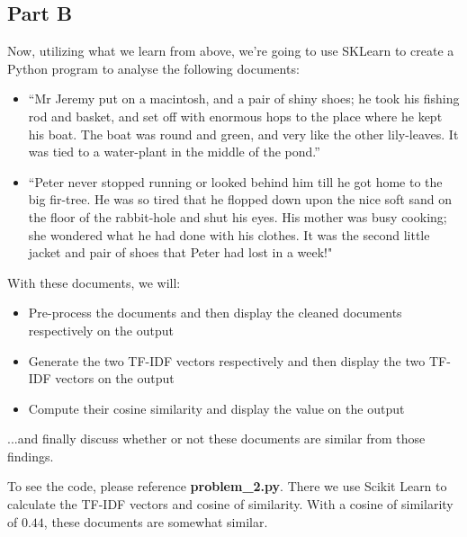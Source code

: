 \documentclass{article}
\begin{document}
\subsection*{Part B}

Now, utilizing what we learn from above, we're going to use SKLearn to create a Python program to analyse the following documents:

\begin{itemize}
    \item “Mr Jeremy put on a macintosh, and a pair of shiny shoes; he took his fishing rod and basket, and set off with enormous hops to the place where he kept his boat. The boat was round and green, and very like the other lily-leaves. It was tied to a water-plant in the middle of the pond.”
    \item “Peter never stopped running or looked behind him till he got home to the big fir-tree. He was so tired that he flopped down upon the nice soft sand on the floor of the rabbit-hole and shut his eyes. His mother was busy cooking; she wondered what he had done with his clothes. It was the second little jacket and pair of shoes that Peter had lost in a week!"
\end{itemize}

With these documents, we will:

\begin{itemize}
    \item Pre-process the documents and then display the cleaned documents respectively on the output
    \item Generate the two TF-IDF vectors respectively and then display the two TF-IDF vectors on the output
    \item Compute their cosine similarity and display the value on the output
\end{itemize}

\noindent ...and finally discuss whether or not these documents are similar from those findings.

To see the code, please reference \textbf{problem\_2.py}. There we use Scikit Learn to calculate the TF-IDF vectors and cosine of similarity. With a cosine of similarity of $0.44$, these documents are somewhat similar.
\end{document}
